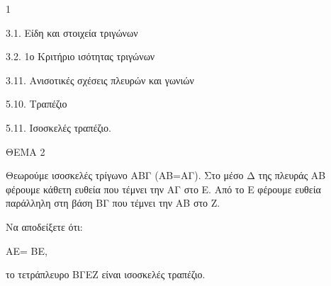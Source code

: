 \begin{ylh}{1}
    \item 3.1. Είδη και στοιχεία τριγώνων
    \item 3.2. 1ο Κριτήριο ισότητας τριγώνων
    \item 3.11. Ανισοτικές σχέσεις πλευρών και γωνιών
    \item 5.10. Τραπέζιο
    \item 5.11. Ισοσκελές τραπέζιο.
\end{ylh}

ΘΕΜΑ 2

Θεωρούμε ισοσκελές τρίγωνο ΑΒΓ (ΑΒ=ΑΓ). Στο μέσο Δ της πλευράς ΑΒ φέρουμε κάθετη ευθεία που τέμνει την ΑΓ στο Ε. Από το Ε φέρουμε ευθεία παράλληλη στη βάση ΒΓ που τέμνει την ΑΒ στο Ζ.

Να αποδείξετε ότι:

\begin{alist}
\item ΑΕ= ΒΕ, 

\item το τετράπλευρο ΒΓΕΖ είναι ισοσκελές τραπέζιο. 


\begin{center}
\end{center}
\end{alist}
